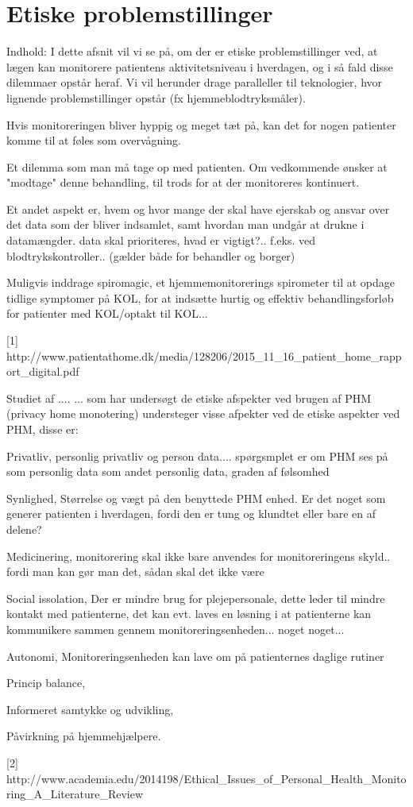 \section{Etiske problemstillinger}
Indhold: I dette afsnit vil vi se på, om der er etiske problemstillinger ved, at lægen kan monitorere patientens aktivitetsniveau i hverdagen, og i så fald disse dilemmaer opstår heraf. Vi vil herunder drage paralleller til teknologier, hvor lignende problemstillinger opstår (fx hjemmeblodtryksmåler). 


Hvis monitoreringen bliver hyppig og meget tæt på, kan det for nogen patienter komme til at føles som overvågning.

Et dilemma som man må tage op med patienten. Om vedkommende ønsker at "modtage" denne behandling, til trods for at der monitoreres kontinuert. 

Et andet aspekt er, hvem og hvor mange der skal have ejerskab og ansvar over det data som der bliver indsamlet, samt hvordan man undgår at drukne i datamængder. data skal prioriteres, hvad er vigtigt?.. f.eks. ved blodtrykskontroller.. (gælder både for behandler og borger)

Muligvis inddrage spiromagic, et hjemmemonitorerings spirometer til at opdage tidlige symptomer på KOL, for at indsætte hurtig og effektiv behandlingsforløb for patienter med KOL/optakt til KOL...


[1] http://www.patientathome.dk/media/128206/2015_11_16_patient_home_rapport_digital.pdf



Studiet af .... ... som har undersøgt de etiske afspekter ved brugen af PHM (privacy home monotering)  understeger visse afpekter ved de etiske aspekter ved PHM, disse er:

Privatliv,
personlig privatliv og person data.... spørgsmplet er om PHM ses på som personlig data som andet personlig data, graden af følsomhed

Synlighed, 
Størrelse og vægt på den benyttede PHM enhed. Er det noget som generer patienten i hverdagen, fordi den er tung og klundtet eller bare en af delene? 

Medicinering, 
monitorering skal ikke bare anvendes for monitoreringens skyld.. fordi man kan gør man det, sådan skal det ikke være

Social issolation, 
Der er mindre brug for plejepersonale, dette leder til mindre kontakt med patienterne, det kan evt. laves en løsning i at patienterne kan kommunikere sammen gennem monitoreringsenheden... noget noget...

Autonomi, 
Monitoreringsenheden kan lave om på patienternes daglige rutiner

Princip balance, 


Informeret samtykke og udvikling, 


Påvirkning på hjemmehjælpere.



[2] http://www.academia.edu/2014198/Ethical_Issues_of_Personal_Health_Monitoring_A_Literature_Review 